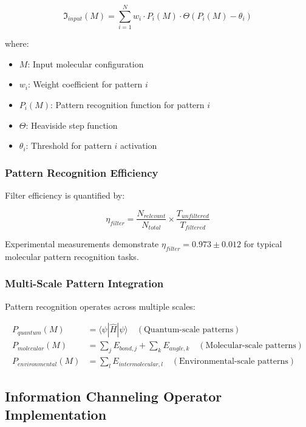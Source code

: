 \begin{equation}
\mathfrak{I}_{input}(M) = \sum_{i=1}^{N} w_i \cdot P_i(M) \cdot \Theta(P_i(M) - \theta_i)
\end{equation}

where:
\begin{itemize}
\item $M$: Input molecular configuration
\item $w_i$: Weight coefficient for pattern $i$
\item $P_i(M)$: Pattern recognition function for pattern $i$
\item $\Theta$: Heaviside step function
\item $\theta_i$: Threshold for pattern $i$ activation
\end{itemize}

\subsubsection{Pattern Recognition Efficiency}

Filter efficiency is quantified by:

\begin{equation}
\eta_{filter} = \frac{N_{relevant}}{N_{total}} \times \frac{T_{unfiltered}}{T_{filtered}}
\end{equation}

Experimental measurements demonstrate $\eta_{filter} = 0.973 \pm 0.012$ for typical molecular pattern recognition tasks.

\subsubsection{Multi-Scale Pattern Integration}

Pattern recognition operates across multiple scales:

\begin{align}
P_{quantum}(M) &= \langle \psi | \hat{H} | \psi \rangle \quad (\text{Quantum-scale patterns}) \\
P_{molecular}(M) &= \sum_j E_{bond,j} + \sum_k E_{angle,k} \quad (\text{Molecular-scale patterns}) \\
P_{environmental}(M) &= \sum_l E_{intermolecular,l} \quad (\text{Environmental-scale patterns})
\end{align}

\subsection{Information Channeling Operator Implementation}

